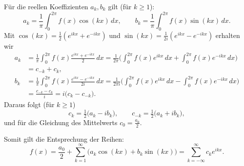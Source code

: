 \begin{beispielbox}
\begin{beweisbox}
        Für die reellen Koeffizienten $a_k,b_k$ gilt (für $k\ge1$):
        $$
        a_k=\frac{1}{\pi}\int_0^{2\pi} f(x)\cos(kx)\,dx,\qquad
        b_k=\frac{1}{\pi}\int_0^{2\pi} f(x)\sin(kx)\,dx.
        $$
        Mit $\cos(kx)=\tfrac{1}{2}(e^{ikx}+e^{-ikx})$ und $\sin(kx)=\tfrac{1}{2i}(e^{ikx}-e^{-ikx})$ erhalten wir
        \begin{align*}
        a_k
        &=\frac{1}{\pi}\int_0^{2\pi} f(x)\frac{e^{ikx}+e^{-ikx}}{2}\,dx
        =\frac{1}{2\pi}\Big(\int_0^{2\pi} f(x)e^{ikx}\,dx+\int_0^{2\pi} f(x)e^{-ikx}\,dx\Big)\\
        &=c_{-k}+c_k,\\[6pt]
        b_k
        &=\frac{1}{\pi}\int_0^{2\pi} f(x)\frac{e^{ikx}-e^{-ikx}}{2i}\,dx
        =\frac{1}{2\pi i}\Big(\int_0^{2\pi} f(x)e^{ikx}\,dx-\int_0^{2\pi} f(x)e^{-ikx}\,dx\Big)\\
        &=\frac{c_{-k}-c_k}{i}=i\big(c_k-c_{-k}\big).
        \end{align*}
        Daraus folgt (für $k\ge1$)
        $$
        c_k=\tfrac{1}{2}\big(a_k - i b_k\big),\qquad
        c_{-k}=\tfrac{1}{2}\big(a_k + i b_k\big),
        $$
        und für die Gleichung des Mittelwerts $c_0=\tfrac{a_0}{2}$.

        Somit gilt die Entsprechung der Reihen:
        $$
        f(x)=\frac{a_0}{2}+\sum_{k=1}^\infty\big(a_k\cos(kx)+b_k\sin(kx)\big)
        =\sum_{k=-\infty}^{\infty} c_k e^{ikx}.
        $$
    \end{beweisbox}
\end{beispielbox}